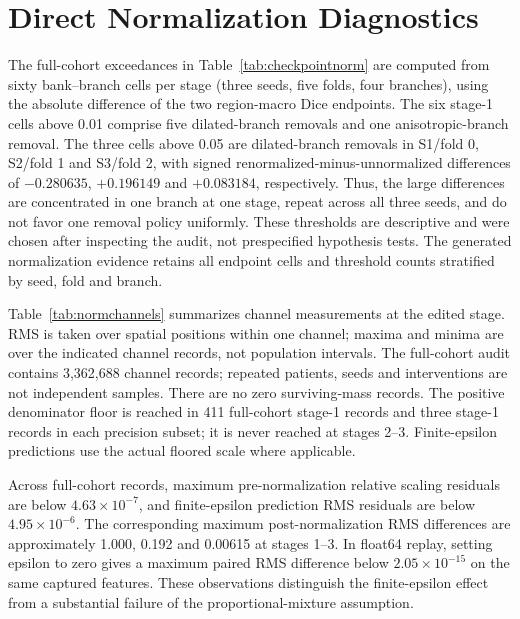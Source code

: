 \documentclass[mathematics,article,submit,pdftex,moreauthors]{Definitions/mdpi}
\begin{document}
\section{Direct Normalization Diagnostics}\label{app:normdiagnostics}
The full-cohort exceedances in Table~\ref{tab:checkpointnorm} are computed
from sixty bank--branch cells per stage (three seeds, five folds, four branches),
using the absolute difference of the two region-macro Dice endpoints.
The six stage-1 cells above 0.01 comprise five dilated-branch removals and
one anisotropic-branch removal. The three cells above 0.05 are dilated-branch
removals in S1/fold 0, S2/fold 1 and S3/fold 2, with signed
renormalized-minus-unnormalized differences of $-0.280635$, $+0.196149$
and $+0.083184$, respectively. Thus, the large differences are concentrated
in one branch at one stage, repeat across all three seeds, and do not favor
one removal policy uniformly. These thresholds are descriptive and were
chosen after inspecting the audit, not prespecified hypothesis tests.
The generated normalization evidence retains all endpoint cells and threshold
counts stratified by seed, fold and branch.

Table~\ref{tab:normchannels} summarizes channel measurements at the edited
stage. RMS is taken over spatial positions within one channel; maxima and
minima are over the indicated channel records, not population intervals.
The full-cohort audit contains 3,362,688 channel records; repeated patients,
seeds and interventions are not independent samples. There are no zero
surviving-mass records. The positive denominator floor is reached in 411
full-cohort stage-1 records and three stage-1 records in each precision subset;
it is never reached at stages 2--3. Finite-epsilon predictions use the actual
floored scale where applicable.

\begin{table}[H]
\caption{Captured channel measurements across fifteen terminal banks.
Post RMS is the observed difference between the two post-normalization
outputs. Prediction RMS is the residual after applying the finite-epsilon
identity to the captured unnormalized-removal output. Floored counts refer
to positive surviving mass below $10^{-8}$.}
\label{tab:normchannels}
\centering\footnotesize\setlength{\tabcolsep}{3pt}

\end{table}

Across full-cohort records, maximum pre-normalization relative scaling
residuals are below $4.63\times10^{-7}$, and finite-epsilon prediction RMS
residuals are below $4.95\times10^{-6}$. The corresponding maximum
post-normalization RMS differences are approximately 1.000, 0.192 and
0.00615 at stages 1--3. In float64 replay, setting epsilon to zero gives
a maximum paired RMS difference below $2.05\times10^{-15}$ on the same
captured features. These observations distinguish the finite-epsilon
effect from a substantial failure of the proportional-mixture assumption.
\end{document}
